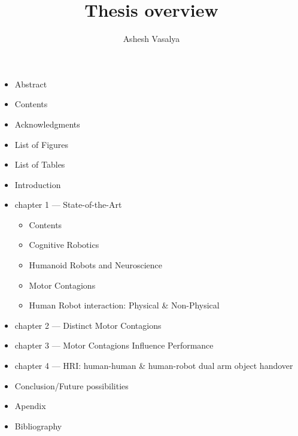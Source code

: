 \documentclass[]{article}
\title{Thesis overview}
\author{Ashesh Vasalya}
\begin{document}
\maketitle

\begin{abstract}

\end{abstract}

\begin{itemize}

	\item Abstract
	\item Contents
	\item Acknowledgments
	\item List of Figures
	\item List of Tables\newline
	
	\item Introduction\newline
	
	\item chapter 1 --- State-of-the-Art
	\begin{itemize}
	\item Contents
	\item Cognitive Robotics
	\item Humanoid Robots and Neuroscience
	\item Motor Contagions
	\item Human Robot interaction: Physical \& Non-Physical
	\end{itemize}	
	\item chapter 2 --- Distinct Motor Contagions
	\item chapter 3 --- Motor Contagions Influence Performance
	\item chapter 4 --- HRI: human-human \& human-robot dual arm object handover\newline

	\item Conclusion/Future possibilities\newline
	
	\item Apendix
	\item Bibliography

\end{itemize}

\newpage
\end{document}
